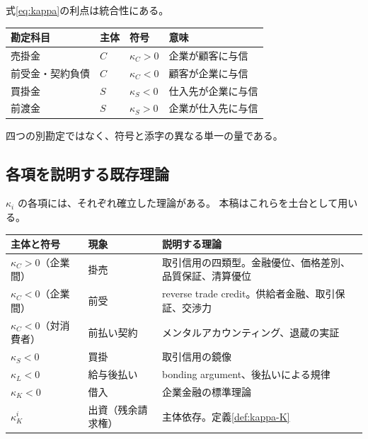 式\eqref{eq:kappa}の利点は統合性にある。

\begin{center}
\begin{tabular}{@{}llll@{}}
\toprule
勘定科目 & 主体 & 符号 & 意味 \\
\midrule
売掛金 & $C$ & $\kappa_C>0$ & 企業が顧客に与信 \\
前受金・契約負債 & $C$ & $\kappa_C<0$ & 顧客が企業に与信 \\
買掛金 & $S$ & $\kappa_S<0$ & 仕入先が企業に与信 \\
前渡金 & $S$ & $\kappa_S>0$ & 企業が仕入先に与信 \\
\bottomrule
\end{tabular}
\label{tab:kappa-accounts}
\end{center}

四つの別勘定ではなく、符号と添字の異なる単一の量である。

\subsection{各項を説明する既存理論}
\label{sec:kappa-literature}

$\kappa_i$ の各項には、それぞれ確立した理論がある。
本稿はこれらを土台として用いる。

\begin{center}
\begin{tabularx}{\textwidth}{@{}llX@{}}
\toprule
主体と符号 & 現象 & 説明する理論 \\
\midrule
$\kappa_C>0$（企業間） & 掛売 & 取引信用の四類型。金融優位、価格差別、品質保証、清算優位 \cite{petersen1997,schwartz1974} \\
$\kappa_C<0$（企業間） & 前受 & reverse trade credit。供給者金融、取引保証、交渉力 \cite{mateut2014,daripa2011} \\
$\kappa_C<0$（対消費者） & 前払い契約 & メンタルアカウンティング、退蔵の実証 \cite{nber2026pnbl} \\
$\kappa_S<0$ & 買掛 & 取引信用の鏡像 \\
$\kappa_L<0$ & 給与後払い & bonding argument、後払いによる規律 \cite{akerlof1986} \\
$\kappa_K<0$ & 借入 & 企業金融の標準理論 \\
$\kappa_K^{i}$ & 出資（残余請求権） & 主体依存。定義\ref{def:kappa-K} \\
\bottomrule
\end{tabularx}
\label{tab:kappa-literature}
\end{center}

